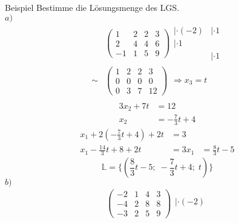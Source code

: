 \documentclass{article}
\begin{document}
\begin{boxx}[DarkBlue]{Beispiel}
    Bestimme die Lösungsmenge des LGS. \\
    $a)$\hspace{3mm}
    \begin{align*}
        &\left( \begin{array}{ccc|c} 1 & 2 & 2 & 3 \\ 2 & 4 & 4  & 6 \\ -1 & 1 & 5 & 9 \end{array} \right) \begin{array}{ll}
             |\cdot (-2) & |\cdot 1 \\
             |\cdot 1& \\
             &|\cdot 1
        \end{array} \\
        \sim&\left( \begin{array}{ccc|c} 1 & 2 & 2 & 3 \\ 0 & 0 & 0 & 0 \\ 0 & 3 & 7 & 12 \end{array} \right) \begin{array}{ll}
             & \\
             \Rightarrow x_3 = t& \\
             &
        \end{array} \\
    \end{align*}
    \begin{align*}
        3 x_2 + 7t &= 12 \\
        x_2 &= - \frac{7}{3}t + 4
    \end{align*}
    \begin{align*}
        x_1 + 2\left(-\frac{7}{3}t + 4\right) + 2t &= 3 \\
        x_1 - \frac{14}{3}t + 8 + 2t &= 3
        x_1 &= \frac{8}{3}t - 5
    \end{align*}
    \[\mathbb{L} = \biggl\{\left(\frac{8}{3}t - 5;\; -\frac{7}{3}t + 4;\; t\right)\biggl\}\]
    $b)$\hspace{3mm}
    \begin{align*}
        &\left( \begin{array}{ccc|c} -2 & 1 & 4 & 3 \\ -4 & 2 & 8  & 8 \\ -3 & 2 & 5 & 9 \end{array} \right) \begin{array}{ll}
             |\cdot (-2) & \\

\end{array}
\end{align*}
\end{boxx}
\end{document}
